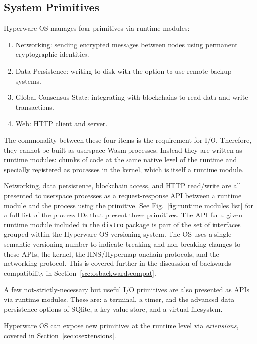 \documentclass[runningheads]{llncs}
\begin{document}
\newpage
\subsection{System Primitives}
\label{sec:osprimitives}

Hyperware OS manages four primitives via runtime modules:

\begin{enumerate}
    \item Networking: sending encrypted messages between nodes using permanent cryptographic identities.
    \item Data Persistence: writing to disk with the option to use remote backup systems.
    \item Global Consensus State: integrating with blockchains to read data and write transactions.
    \item Web: HTTP client and server.
\end{enumerate}

The commonality between these four items is the requirement for I/O.
Therefore, they cannot be built as userspace Wasm processes.
Instead they are written as runtime modules: chunks of code at the same native level of the runtime and specially registered as processes in the kernel, which is itself a runtime module.

Networking, data persistence, blockchain access, and HTTP read/write are all presented to userspace processes as a request-response API between a runtime module and the process using the primitive.
See Fig.~\ref{fig:runtime modules list} for a full list of the process IDs that present these primitives.
The API for a given runtime module included in the \verb|distro| package is part of the set of interfaces grouped within the Hyperware OS versioning system.
The OS uses a single semantic versioning number to indicate breaking and non-breaking changes to these APIs, the kernel, the HNS/Hypermap onchain protocols, and the networking protocol.
This is covered further in the discussion of backwards compatibility in Section~\ref{sec:osbackwardscompat}.

A few not-strictly-necessary but useful I/O primitives are also presented as APIs via runtime modules.
These are: a terminal, a timer, and the advanced data persistence options of SQlite, a key-value store, and a virtual filesystem.

Hyperware OS can expose new primitives at the runtime level via \textit{extensions}, covered in Section~\ref{sec:osextensions}.
\end{document}
